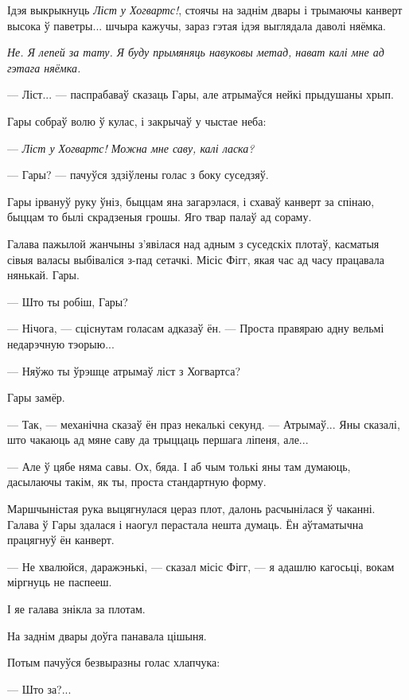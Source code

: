 Ідэя выкрыкнуць \emph{Ліст у Хогвартс!}, стоячы на заднім двары і трымаючы канверт высока ў
паветры... шчыра кажучы, зараз гэтая ідэя выглядала даволі няёмка.

\emph{Не. Я лепей за тату. Я буду прымяняць навуковы метад, нават калі мне ад гэтага няёмка.}

--- Ліст... --- паспрабаваў сказаць Гары, але атрымаўся нейкі прыдушаны хрып. 

Гары собраў волю ў кулас, і закрычаў у чыстае неба:

--- \emph{Ліст у Хогвартс! Можна мне саву, калі ласка?}

--- Гары? --- пачуўся здзіўлены голас з боку суседзяў.

Гары ірвануў руку ўніз, быццам яна загарэлася, і схаваў канверт за спінаю, быццам то былі
скрадзеныя грошы. Яго твар палаў ад сораму. 

Галава пажылой жанчыны з'явілася над адным з суседскіх плотаў, касматыя сівыя валасы выбіваліся
з-пад сетачкі. Місіс Фігг, якая час ад часу працавала нянькай. Гары.

--- Што ты робіш, Гары?

--- Нічога, --- сціснутам голасам адказаў ён. --- Проста правяраю адну вельмі недарэчную тэорыю...

--- Няўжо ты ўрэшце атрымаў ліст з Хогвартса?

Гары замёр.

--- Так, --- механічна сказаў ён праз некалькі секунд. --- Атрымаў... Яны сказалі, што
чакаюць ад мяне саву да трыццаць першага ліпеня, але...

--- Але ў цябе няма савы. Ох, бяда. І аб чым толькі яны там думаюць, дасылаючы такім, як ты, проста
стандартную форму.

Маршчыністая рука выцягнулася цераз плот, далонь расчынілася ў чаканні. Галава ў Гары
здалася і наогул перастала нешта думаць. Ён аўтаматычна працягнуў ён канверт.

--- Не хвалюйся, даражэнькі, --- сказал місіс Фігг, --- я адашлю кагосьці, вокам міргнуць не
паспееш.

І яе галава знікла за плотам.

На заднім двары доўга панавала цішыня.

Потым пачуўся безвыразны голас хлапчука:

--- Што за?...
